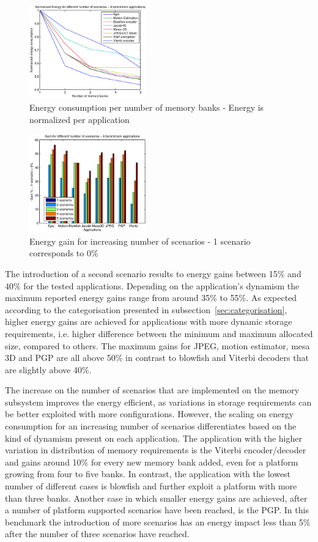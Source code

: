 \documentclass[a4paper,conference]{IEEEtran}
\begin{document}
\begin{figure}[!t]
\centering
\includegraphics[width=0.45\textwidth]{Images/6apps.eps}
\caption{Energy consumption per number of memory banks - Energy is normalized per application}
\label{fig:energy}
\end{figure}

\begin{figure}[!t]
\centering
\includegraphics[width=0.45\textwidth]{Images/6appsGains.eps}
\caption{Energy gain for increasing number of scenarios - 1 scenario corresponds to 0\%}
\label{fig:gains}
\end{figure}

The introduction of a second scenario results to energy gains between 15\% and  40\%  for the tested applications. Depending on the application's dynamism the maximum reported energy gains range from around 35\% to 55\%. As expected according to the categorisation presented in subsection~\ref{sec:categorisation}, higher energy gains are achieved for applications with more dynamic storage requirements, i.e. higher difference between the minimum and maximum allocated size, compared to others. The maximum gains for JPEG, motion estimator, mesa 3D and PGP are all above 50\% in contrast to blowfish and Viterbi decoders that are slightly above 40\%.

The increase on the number of scenarios that are implemented on the memory subsystem improves the energy efficient, as variations in storage requirements can be better exploited with more configurations. However, the scaling on energy consumption for an increasing number of scenarios differentiates based on the kind of dynamism present on each application. The application with the higher variation in distribution of memory requirements is the Viterbi encoder/decoder and gains around 10\% for every new memory bank added, even for a platform growing from four to five banks. In contrast, the application with the lowest number of different cases is blowfish and further exploit a platform with more than three banks. Another case in which smaller energy gains are achieved, after a number of platform supported scenarios have been reached, is the PGP. In this benchmark the introduction of more scenarios has an energy impact less than 5\% after the number of three scenarios have reached.
\end{document}
